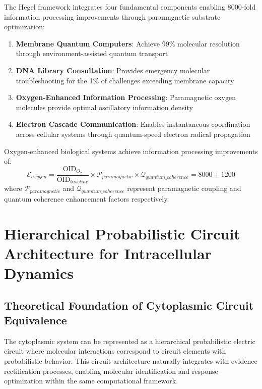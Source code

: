 \documentclass[11pt,a4paper]{article}
\begin{document}
The Hegel framework integrates four fundamental components enabling 8000-fold information processing improvements through paramagnetic substrate optimization:

\begin{enumerate}
\item \textbf{Membrane Quantum Computers}: Achieve 99\% molecular resolution through environment-assisted quantum transport
\item \textbf{DNA Library Consultation}: Provides emergency molecular troubleshooting for the 1\% of challenges exceeding membrane capacity
\item \textbf{Oxygen-Enhanced Information Processing}: Paramagnetic oxygen molecules provide optimal oscillatory information density
\item \textbf{Electron Cascade Communication}: Enables instantaneous coordination across cellular systems through quantum-speed electron radical propagation
\end{enumerate}

\begin{theorem}
Oxygen-enhanced biological systems achieve information processing improvements of:
\begin{equation}
\mathcal{E}_{oxygen} = \frac{\text{OID}_{O_2}}{\text{OID}_{baseline}} \times \mathcal{P}_{paramagnetic} \times \mathcal{Q}_{quantum\_coherence} = 8000 \pm 1200
\end{equation}
where $\mathcal{P}_{paramagnetic}$ and $\mathcal{Q}_{quantum\_coherence}$ represent paramagnetic coupling and quantum coherence enhancement factors respectively.
\end{theorem}

\section{Hierarchical Probabilistic Circuit Architecture for Intracellular Dynamics}

\subsection{Theoretical Foundation of Cytoplasmic Circuit Equivalence}

The cytoplasmic system can be represented as a hierarchical probabilistic electric circuit where molecular interactions correspond to circuit elements with probabilistic behavior. This circuit architecture naturally integrates with evidence rectification processes, enabling molecular identification and response optimization within the same computational framework.
\end{document}

